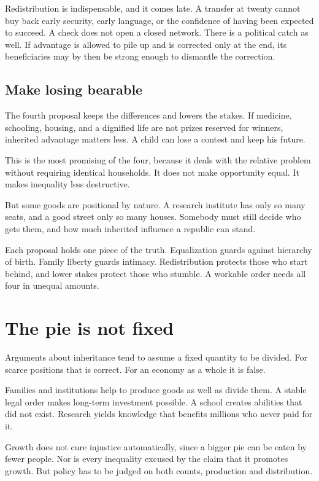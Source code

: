 \documentclass[12pt,a4paper]{book}
\begin{document}
Redistribution is indispensable, and it comes late. A transfer at twenty cannot buy back early security, early language, or the confidence of having been expected to succeed. A check does not open a closed network. There is a political catch as well. If advantage is allowed to pile up and is corrected only at the end, its beneficiaries may by then be strong enough to dismantle the correction.

\subsection{Make losing bearable}

The fourth proposal keeps the differences and lowers the stakes. If medicine, schooling, housing, and a dignified life are not prizes reserved for winners, inherited advantage matters less. A child can lose a contest and keep his future.

This is the most promising of the four, because it deals with the relative problem without requiring identical households. It does not make opportunity equal. It makes inequality less destructive.

But some goods are positional by nature. A research institute has only so many seats, and a good street only so many houses. Somebody must still decide who gets them, and how much inherited influence a republic can stand.

Each proposal holds one piece of the truth. Equalization guards against hierarchy of birth. Family liberty guards intimacy. Redistribution protects those who start behind, and lower stakes protect those who stumble. A workable order needs all four in unequal amounts.

\section{The pie is not fixed}

Arguments about inheritance tend to assume a fixed quantity to be divided. For scarce positions that is correct. For an economy as a whole it is false.

Families and institutions help to produce goods as well as divide them. A stable legal order makes long-term investment possible. A school creates abilities that did not exist. Research yields knowledge that benefits millions who never paid for it.

Growth does not cure injustice automatically, since a bigger pie can be eaten by fewer people. Nor is every inequality excused by the claim that it promotes growth. But policy has to be judged on both counts, production and distribution.
\end{document}
